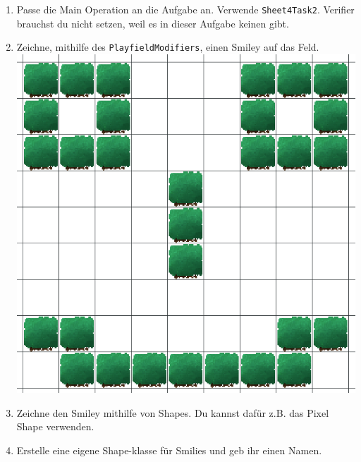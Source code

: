 \begin{enumerate}
    \item Passe die Main Operation an die Aufgabe an. Verwende \lstinline{Sheet4Task2}. Verifier brauchst du nicht setzen, weil es in dieser Aufgabe keinen gibt.
    \item Zeichne, mithilfe des \lstinline{PlayfieldModifiers}, einen Smiley auf das Feld.
    \\ \includegraphics[width=\linewidth]{./figures/smily.png}
    \item Zeichne den Smiley mithilfe von Shapes. Du kannst dafür z.B. das Pixel Shape verwenden.
    \item Erstelle eine eigene Shape-klasse für Smilies und geb ihr einen Namen.
    

\end{enumerate}
